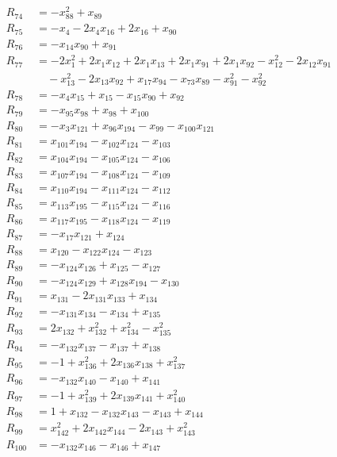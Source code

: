 \begin{align*}
R_{74}&=-x_{88}^{2}+x_{89}\\[2pt]
R_{75}&=-x_{4}-2x_{4}x_{16}+2x_{16}+x_{90}\\[2pt]
R_{76}&=-x_{14}x_{90}+x_{91}\\[2pt]
R_{77}&=-2x_{1}^{2}+2x_{1}x_{12}+2x_{1}x_{13}+2x_{1}x_{91}+2x_{1}x_{92}-x_{12}^{2}-2x_{12}x_{91}\\
&\quad -x_{13}^{2}-2x_{13}x_{92}+x_{17}x_{94}-x_{73}x_{89}-x_{91}^{2}-x_{92}^{2}\\[2pt]
R_{78}&=-x_{4}x_{15}+x_{15}-x_{15}x_{90}+x_{92}\\[2pt]
R_{79}&=-x_{95}x_{98}+x_{98}+x_{100}\\[2pt]
R_{80}&=-x_{3}x_{121}+x_{96}x_{194}-x_{99}-x_{100}x_{121}\\[2pt]
R_{81}&=x_{101}x_{194}-x_{102}x_{124}-x_{103}\\[2pt]
R_{82}&=x_{104}x_{194}-x_{105}x_{124}-x_{106}\\[2pt]
R_{83}&=x_{107}x_{194}-x_{108}x_{124}-x_{109}\\[2pt]
R_{84}&=x_{110}x_{194}-x_{111}x_{124}-x_{112}\\[2pt]
R_{85}&=x_{113}x_{195}-x_{115}x_{124}-x_{116}\\[2pt]
R_{86}&=x_{117}x_{195}-x_{118}x_{124}-x_{119}\\[2pt]
R_{87}&=-x_{17}x_{121}+x_{124}\\[2pt]
R_{88}&=x_{120}-x_{122}x_{124}-x_{123}\\[2pt]
R_{89}&=-x_{124}x_{126}+x_{125}-x_{127}\\[2pt]
R_{90}&=-x_{124}x_{129}+x_{128}x_{194}-x_{130}\\[2pt]
R_{91}&=x_{131}-2x_{131}x_{133}+x_{134}\\[2pt]
R_{92}&=-x_{131}x_{134}-x_{134}+x_{135}\\[2pt]
R_{93}&=2x_{132}+x_{132}^{2}+x_{134}^{2}-x_{135}^{2}\\[2pt]
R_{94}&=-x_{132}x_{137}-x_{137}+x_{138}\\[2pt]
R_{95}&=-1+x_{136}^{2}+2x_{136}x_{138}+x_{137}^{2}\\[2pt]
R_{96}&=-x_{132}x_{140}-x_{140}+x_{141}\\[2pt]
R_{97}&=-1+x_{139}^{2}+2x_{139}x_{141}+x_{140}^{2}\\[2pt]
R_{98}&=1+x_{132}-x_{132}x_{143}-x_{143}+x_{144}\\[2pt]
R_{99}&=x_{142}^{2}+2x_{142}x_{144}-2x_{143}+x_{143}^{2}\\[2pt]
R_{100}&=-x_{132}x_{146}-x_{146}+x_{147}\\[2pt]

\end{align*}

